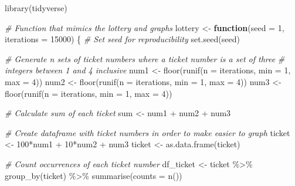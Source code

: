 \documentclass[
]{article}
\newenvironment{Shaded}{\begin{snugshade}}{\end{snugshade}}
\newcommand{\AttributeTok}[1]{\textcolor[rgb]{0.77,0.63,0.00}{#1}}
\newcommand{\CommentTok}[1]{\textcolor[rgb]{0.56,0.35,0.01}{\textit{#1}}}
\newcommand{\ControlFlowTok}[1]{\textcolor[rgb]{0.13,0.29,0.53}{\textbf{#1}}}
\newcommand{\DecValTok}[1]{\textcolor[rgb]{0.00,0.00,0.81}{#1}}
\newcommand{\FunctionTok}[1]{\textcolor[rgb]{0.00,0.00,0.00}{#1}}
\newcommand{\NormalTok}[1]{#1}
\newcommand{\OtherTok}[1]{\textcolor[rgb]{0.56,0.35,0.01}{#1}}
\newcommand{\SpecialCharTok}[1]{\textcolor[rgb]{0.00,0.00,0.00}{#1}}
\newcommand{\StringTok}[1]{\textcolor[rgb]{0.31,0.60,0.02}{#1}}
\begin{document}
\begin{Shaded}
\begin{Highlighting}[]
\FunctionTok{library}\NormalTok{(}\StringTok{\textquotesingle{}tidyverse\textquotesingle{}}\NormalTok{)}

\CommentTok{\# Function that mimics the lottery and graphs}
\NormalTok{lottery }\OtherTok{\textless{}{-}} \ControlFlowTok{function}\NormalTok{(}\AttributeTok{seed =} \DecValTok{1}\NormalTok{, }\AttributeTok{iterations =} \DecValTok{15000}\NormalTok{) \{}
  \CommentTok{\# Set seed for reproducibility}
  \FunctionTok{set.seed}\NormalTok{(seed)}
  
  \CommentTok{\# Generate n sets of ticket numbers where a ticket number is a set of three}
  \CommentTok{\# integers between 1 and 4 inclusive}
\NormalTok{  num1 }\OtherTok{\textless{}{-}} \FunctionTok{floor}\NormalTok{(}\FunctionTok{runif}\NormalTok{(}\AttributeTok{n =}\NormalTok{ iterations, }\AttributeTok{min =} \DecValTok{1}\NormalTok{, }\AttributeTok{max =} \DecValTok{4}\NormalTok{))}
\NormalTok{  num2 }\OtherTok{\textless{}{-}} \FunctionTok{floor}\NormalTok{(}\FunctionTok{runif}\NormalTok{(}\AttributeTok{n =}\NormalTok{ iterations, }\AttributeTok{min =} \DecValTok{1}\NormalTok{, }\AttributeTok{max =} \DecValTok{4}\NormalTok{))}
\NormalTok{  num3 }\OtherTok{\textless{}{-}} \FunctionTok{floor}\NormalTok{(}\FunctionTok{runif}\NormalTok{(}\AttributeTok{n =}\NormalTok{ iterations, }\AttributeTok{min =} \DecValTok{1}\NormalTok{, }\AttributeTok{max =} \DecValTok{4}\NormalTok{))}
  
  \CommentTok{\# Calculate sum of each ticket}
\NormalTok{  sum }\OtherTok{\textless{}{-}}\NormalTok{ num1 }\SpecialCharTok{+}\NormalTok{ num2 }\SpecialCharTok{+}\NormalTok{ num3}
  
  \CommentTok{\# Create dataframe with ticket numbers in order to make easier to graph}
\NormalTok{  ticket }\OtherTok{\textless{}{-}} \DecValTok{100}\SpecialCharTok{*}\NormalTok{num1 }\SpecialCharTok{+} \DecValTok{10}\SpecialCharTok{*}\NormalTok{num2 }\SpecialCharTok{+}\NormalTok{ num3}
\NormalTok{  ticket }\OtherTok{\textless{}{-}} \FunctionTok{as.data.frame}\NormalTok{(ticket)}
  
  \CommentTok{\# Count occurrences of each ticket number}
\NormalTok{  df\_ticket }\OtherTok{\textless{}{-}}\NormalTok{ ticket }\SpecialCharTok{\%\textgreater{}\%}
    \FunctionTok{group\_by}\NormalTok{(ticket) }\SpecialCharTok{\%\textgreater{}\%}
    \FunctionTok{summarise}\NormalTok{(}\AttributeTok{counts =} \FunctionTok{n}\NormalTok{())}
  

\end{Highlighting}
\end{Shaded}
\end{document}
